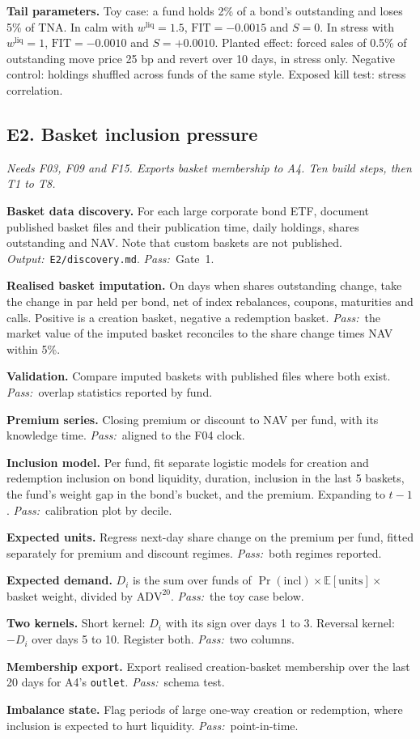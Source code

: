\documentclass[11pt,letterpaper]{article}
\makeatletter
\newcommand{\code}[1]{\texttt{#1}}
\newcommand{\E}{\mathbb{E}}
\newcommand{\ADV}{\mathrm{ADV}}
\newcommand{\FIT}{\mathrm{FIT}}
\newcommand*{\twodigit}[1]{\expandafter\@twodigit\csname c@#1\endcsname}
\newcommand*{\@twodigit}[1]{\ifnum#1<10 0\fi\number#1}
\newcommand{\stepname}[1]{\textbf{#1.}}
\newcommand{\Out}{\textit{Output:}~}
\newcommand{\Pass}{\textit{Pass:}~}
\makeatother
\begin{document}
\textbf{Tail parameters.} Toy case: a fund holds 2\% of a bond's outstanding and loses 5\% of TNA. In calm with $w^{\mathrm{liq}}=1.5$, $\FIT=-0.0015$ and $S=0$. In stress with $w^{\mathrm{liq}}=1$, $\FIT=-0.0010$ and $S=+0.0010$. Planted effect: forced sales of 0.5\% of outstanding move price 25 bp and revert over 10 days, in stress only. Negative control: holdings shuffled across funds of the same style. Exposed kill test: stress correlation.

\subsection{E2. Basket inclusion pressure}
\emph{Needs F03, F09 and F15. Exports basket membership to A4. Ten build steps, then T1 to T8.}
\begin{ladder}[label=\textbf{E2.\twodigit*}]
\item \stepname{Basket data discovery} For each large corporate bond ETF, document published basket files and their publication time, daily holdings, shares outstanding and NAV. Note that custom baskets are not published. \Out \code{E2/discovery.md}. \Pass Gate~1.
\item \stepname{Realised basket imputation} On days when shares outstanding change, take the change in par held per bond, net of index rebalances, coupons, maturities and calls. Positive is a creation basket, negative a redemption basket. \Pass the market value of the imputed basket reconciles to the share change times NAV within 5\%.
\item \stepname{Validation} Compare imputed baskets with published files where both exist. \Pass overlap statistics reported by fund.
\item \stepname{Premium series} Closing premium or discount to NAV per fund, with its knowledge time. \Pass aligned to the F04 clock.
\item \stepname{Inclusion model} Per fund, fit separate logistic models for creation and redemption inclusion on bond liquidity, duration, inclusion in the last 5 baskets, the fund's weight gap in the bond's bucket, and the premium. Expanding to $t-1$. \Pass calibration plot by decile.
\item \stepname{Expected units} Regress next-day share change on the premium per fund, fitted separately for premium and discount regimes. \Pass both regimes reported.
\item \stepname{Expected demand} $D_i$ is the sum over funds of $\Pr(\mathrm{incl})\times\E[\mathrm{units}]\times$ basket weight, divided by $\ADV^{20}$. \Pass the toy case below.
\item \stepname{Two kernels} Short kernel: $D_i$ with its sign over days 1 to 3. Reversal kernel: $-D_i$ over days 5 to 10. Register both. \Pass two columns.
\item \stepname{Membership export} Export realised creation-basket membership over the last 20 days for A4's \code{outlet}. \Pass schema test.
\item \stepname{Imbalance state} Flag periods of large one-way creation or redemption, where inclusion is expected to hurt liquidity. \Pass point-in-time.
\end{ladder}
\end{document}
